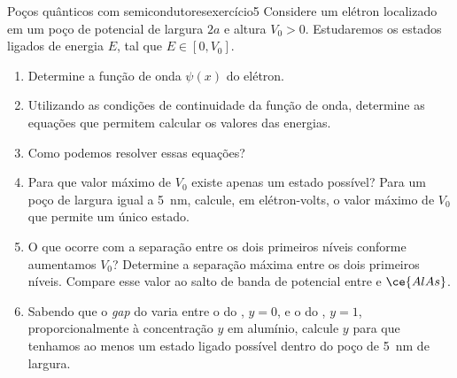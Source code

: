 \begin{exercício}{Poços quânticos com semicondutores}{exercício5}
    Considere um elétron localizado em um poço de potencial de largura \(2a\) e altura \(V_0 > 0\). Estudaremos os estados ligados de energia \(E\), tal que \(E \in [0, V_0].\)
    \begin{enumerate}[label=(\alph*)]
        \item Determine a função de onda \(\psi(x)\) do elétron.
        \item Utilizando as condições de continuidade da função de onda, determine as equações que permitem calcular os valores das energias.
        \item Como podemos resolver essas equações?
        \item Para que valor máximo de \(V_0\) existe apenas um estado possível? Para um poço de largura igual a \SI{5}{\nano\meter}, calcule, em elétron-volts, o valor máximo de \(V_0\) que permite um único estado.
        \item O que ocorre com a separação entre os dois primeiros níveis conforme aumentamos \(V_0\)? Determine a separação máxima entre os dois primeiros níveis.  Compare esse valor ao salto de banda de potencial entre  e \(\ce{AlAs}\).
        \item Sabendo que o \textit{gap} do  varia entre o do , \(y = 0\), e o do , \(y=1\), proporcionalmente à concentração \(y\) em alumínio, calcule \(y\) para que tenhamos ao menos um estado ligado possível dentro do poço de \SI{5}{\nano\meter} de largura.
    \end{enumerate}
\end{exercício}
